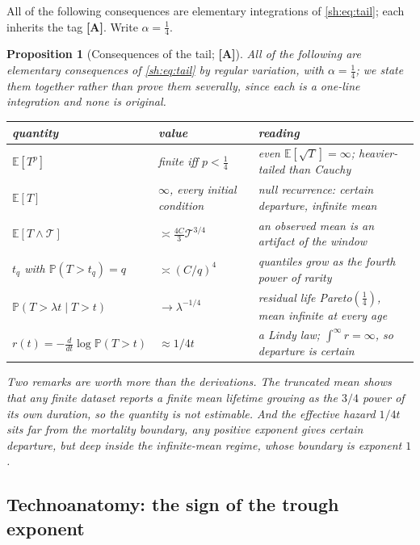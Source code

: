\documentclass[11pt]{article}
\numberwithin{equation}{section}
\theoremstyle{plain}
\newtheorem{proposition}[theorem]{Proposition}
\theoremstyle{definition}
\theoremstyle{remark}
\newcommand{\E}{\mathbb{E}}
\newcommand{\PP}{\mathbb{P}}
\begin{document}
All of the following consequences are elementary integrations of
\eqref{sh:eq:tail}; each inherits the tag \textbf{[A]}. Write
$\alpha=\tfrac14$.

\begin{proposition}[Consequences of the tail; \textbf{[A]}]
\label{sh:prop:tailconseq}\label{sh:cor:moments}\label{sh:cor:mean}%
\label{sh:cor:trunc}\label{sh:cor:quant}\label{sh:cor:residual}%
\label{sh:cor:lindy}
All of the following are elementary consequences of \eqref{sh:eq:tail}
by regular variation, with $\alpha=\tfrac14$; we state them together
rather than prove them severally, since each is a one-line integration
and none is original.

\begin{center}\small
\begin{tabular}{@{}lll@{}}
\toprule
quantity & value & reading\\
\midrule
$\E[T^{p}]$ & finite iff $p<\tfrac14$ &
even $\E[\sqrt T]=\infty$; heavier-tailed than Cauchy\\
$\E[T]$ & $\infty$, every initial condition &
null recurrence: certain departure, infinite mean\\
$\E[T\wedge\mathcal T]$ & $\asymp\tfrac{4C}{3}\mathcal T^{3/4}$ &
an observed mean is an artifact of the window\\
$t_q$ with $\PP(T>t_q)=q$ & $\asymp(C/q)^{4}$ &
quantiles grow as the fourth power of rarity\\
$\PP(T>\lambda t\mid T>t)$ & $\to\lambda^{-1/4}$ &
residual life Pareto$(\tfrac14)$, mean infinite at every age\\
$r(t)=-\tfrac{d}{dt}\log\PP(T>t)$ & $\approx 1/4t$ &
a Lindy law; $\int^\infty r=\infty$, so departure is certain\\
\bottomrule
\end{tabular}
\end{center}

\noindent Two remarks are worth more than the derivations. The truncated
mean shows that any finite dataset reports a finite mean lifetime
growing as the $3/4$ power of its own duration, so the quantity is not
estimable. And the effective hazard $1/4t$ sits far from the mortality
boundary, any positive exponent gives certain departure, but deep
inside the infinite-mean regime, whose boundary is exponent $1$.
\end{proposition}

\subsection{Technoanatomy: the sign of the trough exponent}
\label{gr1:sub:anatomy}
\end{document}

